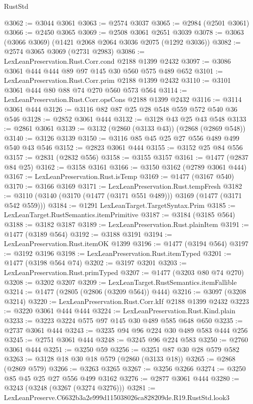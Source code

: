 \begin{lexlean}{RustStd}
\begin{coremodule}
@3062 := @3044 @3061
@3063 := @2574 @3037
@3065 := @2984 (@2501 @3061)
@3066 := @2450 @3065
@3069 := @2508 @3061 @2651 @3039
@3078 := @3063 (@3066 @3069) (@1421 @2068 @2064 @3036 @2075 (@1292 @3036))
@3082 := @2574 @3065 @3069 (@2731 @2983)
@3086 := LexLeanPreservation.Rust.Corr.cond @2188 @1399 @2432
@3097 := @3086 @3061 @444 @444 @89 @97 @145 @30 @560 @575 @489 @652
@3101 := LexLeanPreservation.Rust.Corr.prim @2188 @1399 @2432
@3110 := @3101 @3061 @444 @80 @88 @74 @270 @560 @573 @564
@3114 := LexLeanPreservation.Rust.Corr.opsCons @2188 @1399 @2432
@3116 := @3114 @3061 @444
@3126 := @3116 @82 @87 @25 @28 @548 @559 @572 @540 @36 @546
@3128 := @2852 @3061 @444
@3132 := @3128 @43 @25 @43 @548
@3133 := @2861 @3061
@3139 := @3132 (@2860 (@3133 @43)) (@2868 (@2869 @548))
@3140 := @3126 @3139
@3150 := @3116 @85 @45 @25 @27 @556 @489 @499 @540 @43 @546
@3152 := @2823 @3061 @444
@3155 := @3152 @25 @84 @556
@3157 := @2831 (@2832 @556)
@3158 := @3155 @3157
@3161 := @1477 (@2837 @84 @25)
@3162 := @3158 @3161
@3166 := @3150 @3162 (@2789 @3061 @444)
@3167 := LexLeanPreservation.Rust.isTemp
@3169 := @1477 (@3167 @540)
@3170 := @3166 @3169
@3171 := LexLeanPreservation.Rust.tempFresh
@3182 := @3110 (@3140 (@3170 (@1477 (@3171 @551 @489))) @3169 (@1477 (@3171 @542 @559)))
@3184 := @1291 LexLeanTarget.TargetSyntax.Prim
@3185 := LexLeanTarget.RustSemantics.itemPrimitive
@3187 := @3184 (@3185 @564)
@3188 := @3182 @3187
@3189 := LexLeanPreservation.Rust.plainItem
@3191 := @1477 (@3189 @564)
@3192 := @3188 @3191
@3194 := LexLeanPreservation.Rust.itemOK @1399
@3196 := @1477 (@3194 @564)
@3197 := @3192 @3196
@3198 := LexLeanPreservation.Rust.itemTyped
@3201 := @1477 (@3198 @564 @74)
@3202 := @3197 @3201
@3203 := LexLeanPreservation.Rust.primTyped
@3207 := @1477 (@3203 @80 @74 @270)
@3208 := @3202 @3207
@3209 := LexLeanTarget.RustSemantics.itemFallible
@3214 := @1477 (@2805 (@2806 (@3209 @564)) @444)
@3216 := @3097 (@3208 @3214)
@3220 := LexLeanPreservation.Rust.Corr.kIf @2188 @1399 @2432
@3223 := @3220 @3061 @444 @444
@3224 := LexLeanPreservation.Rust.Kind.plain
@3233 := @3223 @3224 @575 @97 @145 @30 @489 @585 @648 @650
@3235 := @2737 @3061 @444
@3243 := @3235 @94 @96 @224 @30 @489 @583 @444 @256
@3245 := @2751 @3061 @444
@3248 := @3245 @96 @224 @583
@3250 := @2760 @3061 @444
@3251 := @3250 @59
@3256 := @3251 @87 @30 @28 @579 @582
@3263 := @3128 @18 @30 @18 @579 (@2860 (@3133 @18))
@3265 := @2868 (@2869 @579)
@3266 := @3263 @3265
@3267 := @3256 @3266
@3274 := @3250 @85 @45 @25 @27 @556 @499 @3162
@3276 := @2877 @3061 @444
@3280 := @3243 (@3248 (@3267 (@3274 @3276)))
@3281 := LexLeanPreserve.C6632b3a2e999d115038026ca828209de.R19.RustStd.look3

\end{coremodule}
\end{lexlean}
